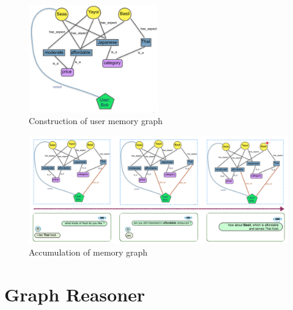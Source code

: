 \begin{figure}[H]
\centering
\includegraphics[width=2.2in]{fig/acl19_graph.png}
    \caption{Construction of user memory graph}
\label{chap5:fig:graph}
\vspace{-15pt}
\end{figure}

\begin{figure}[H]
\centering    
\includegraphics[width=8.0in]{fig/acl19_cum.png}
    \caption{Accumulation of memory graph}
\label{chap5:fig:cum}
\vspace{-3mm}
\end{figure}

\section{Graph Reasoner}
\label{chap5:sec:umgr}

